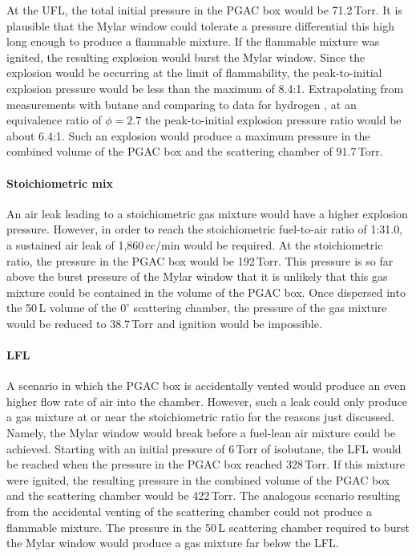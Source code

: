 At the UFL, the total initial pressure in the PGAC box would be 71.2\,Torr. %
  It is plausible %
that the Mylar window could tolerate a pressure differential this high long enough to produce a flammable mixture.  If the flammable mixture was ignited, the resulting explosion would burst the Mylar window.  Since the explosion would be occurring at the limit of flammability, the peak-to-initial explosion pressure would be less than the maximum of 8.4:1.  Extrapolating from measurements with butane \cite{Razus_2007} and comparing to data for hydrogen \cite{Dahoe_2005}, at an equivalence ratio of $\phi=2.7$ the peak-to-initial explosion pressure ratio would be about 6.4:1.  Such an explosion would produce a maximum pressure in the combined  volume of the PGAC box and the scattering chamber of 91.7\,Torr. %

\paragraph{Stoichiometric mix} An air leak leading to a stoichiometric gas mixture would have a higher explosion pressure.  However, in order to reach the stoichiometric fuel-to-air ratio of 1:31.0, a sustained air leak of 
1,860\,cc/min
 would be required.  At the stoichiometric ratio, the pressure in the PGAC box would be 
 192\,Torr. %
   This pressure is %
 so far above the
 burst pressure of the Mylar window that %
 it is unlikely that this gas mixture could be contained in the volume of the PGAC box.  Once dispersed into the 50\,L volume of the $0^\circ$ scattering chamber, the pressure of the gas mixture would be reduced to 38.7\,Torr %
 and ignition would be impossible.

\paragraph {LFL}A scenario in which the PGAC box is accidentally vented would produce an even higher flow rate of air into the chamber.  However, such a leak  could only produce a gas mixture at or near the stoichiometric ratio for the reasons just discussed.  Namely, the Mylar window would break before a fuel-lean air mixture could be achieved.  Starting with an initial pressure of 6\,Torr of isobutane, %
the LFL would be reached when the pressure in the PGAC box reached 328\,Torr. %
 If this mixture were ignited, the resulting pressure in the combined volume of the PGAC box and the scattering chamber would be 422\,Torr. %
   The analogous scenario resulting from the accidental venting of the scattering chamber could not produce a flammable mixture.  The pressure in the 50\,L scattering chamber required to burst the Mylar window would produce a gas mixture far below the LFL.

